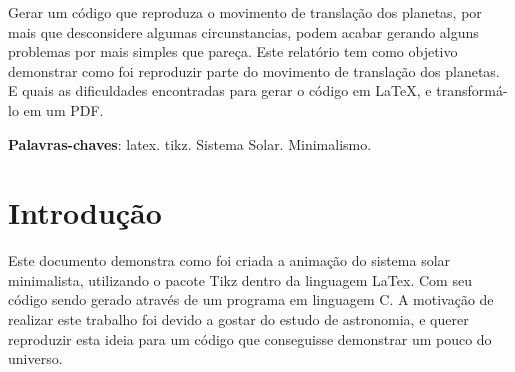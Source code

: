 \documentclass[
	12pt,				%
	openright,			%
	oneside,
	a4paper,			%
	english,			%
	french,				%
	spanish,			%
	brazil,				%
	]{abntex2}
\begin{document}
\frenchspacing 


\imprimircapa

\imprimirfolhaderosto%



\setlength{\absparsep}{18pt} %
\begin{resumo}
Gerar um código que reproduza o movimento de translação dos planetas, por mais que desconsidere algumas circunstancias, podem acabar gerando alguns problemas por mais simples que pareça.
Este relatório tem como objetivo demonstrar como foi reproduzir parte do movimento de translação dos planetas. E quais as dificuldades encontradas para gerar o código em \LaTeX, e transformá-lo em um PDF.

 \noindent
 \textbf{Palavras-chaves}: latex. tikz. Sistema Solar. Minimalismo.
\end{resumo}

\tableofcontents*
\cleardoublepage

\textual

\chapter[Introdução]{Introdução}

Este documento demonstra como foi criada a animação do sistema solar minimalista, utilizando o pacote Tikz dentro da linguagem LaTex. Com seu código sendo gerado através de um programa em linguagem C. A motivação de realizar este trabalho foi devido a gostar do estudo de astronomia, e querer reproduzir esta ideia para um código que conseguisse demonstrar um pouco do universo.
\end{document}

